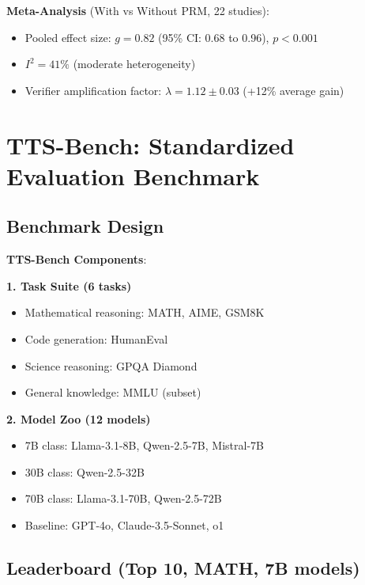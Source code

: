 \documentclass[10pt,preprint]{neurips_2024}
\begin{document}
\textbf{Meta-Analysis} (With vs Without PRM, 22 studies):
\begin{itemize}
    \item Pooled effect size: $g = 0.82$ (95\% CI: 0.68 to 0.96), $p < 0.001$
    \item $I^2 = 41\%$ (moderate heterogeneity)
    \item Verifier amplification factor: $\lambda = 1.12 \pm 0.03$ (+12\% average gain)
\end{itemize}

\section{TTS-Bench: Standardized Evaluation Benchmark}

\subsection{Benchmark Design}

\textbf{TTS-Bench Components}:

\textbf{1. Task Suite (6 tasks)}
\begin{itemize}
    \item Mathematical reasoning: MATH, AIME, GSM8K
    \item Code generation: HumanEval
    \item Science reasoning: GPQA Diamond
    \item General knowledge: MMLU (subset)
\end{itemize}

\textbf{2. Model Zoo (12 models)}
\begin{itemize}
    \item 7B class: Llama-3.1-8B, Qwen-2.5-7B, Mistral-7B
    \item 30B class: Qwen-2.5-32B
    \item 70B class: Llama-3.1-70B, Qwen-2.5-72B
    \item Baseline: GPT-4o, Claude-3.5-Sonnet, o1
\end{itemize}

\subsection{Leaderboard (Top 10, MATH, 7B models)}
\end{document}
